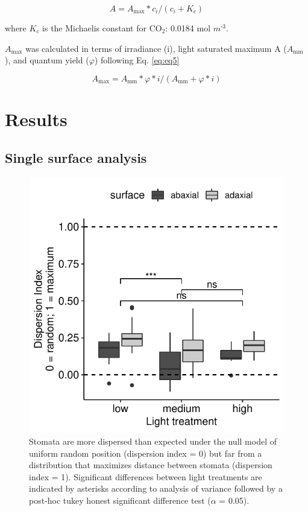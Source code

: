 \documentclass[12pt,halfline,a4paper,]{ouparticle}
\begin{document}
\begin{equation}\label{eq:eq4}
A = A_\text{max} * c_i / (c_i + K_c)
\end{equation}

where \(K_c\) is the Michaelis constant for CO\(_2\): 0.0184 mol
\(m^\text{-3}\).

\(A_\text{max}\) was calculated in terms of irradiance (i), light
saturated maximum A (\(A_\text{mm}\)), and quantum yield (\(\varphi\))
following Eq. \ref{eq:eq5}

\begin{equation}\label{eq:eq5}
A_\text{max} = A_\text{mm} * \varphi * i / (A_\text{mm} + \varphi * i)
\end{equation}

\hypertarget{results}{%
\section{Results}\label{results}}

\hypertarget{single-surface-analysis-1}{%
\subsection{Single surface analysis}\label{single-surface-analysis-1}}

\begin{figure}[ht]
\includegraphics[width=\textwidth]{figures/single-surface.pdf}
\caption{Stomata are more dispersed than expected under the null model of uniform random position (dispersion index = 0) but far from a distribution that maximizes distance between stomata (dispersion index = 1). Significant differences between light treatments are indicated by asterisks according to analysis of variance followed by a post-hoc tukey honest significant difference test ($\alpha$ = 0.05).}
\label{fig:dispersion}
\end{figure}
\end{document}
